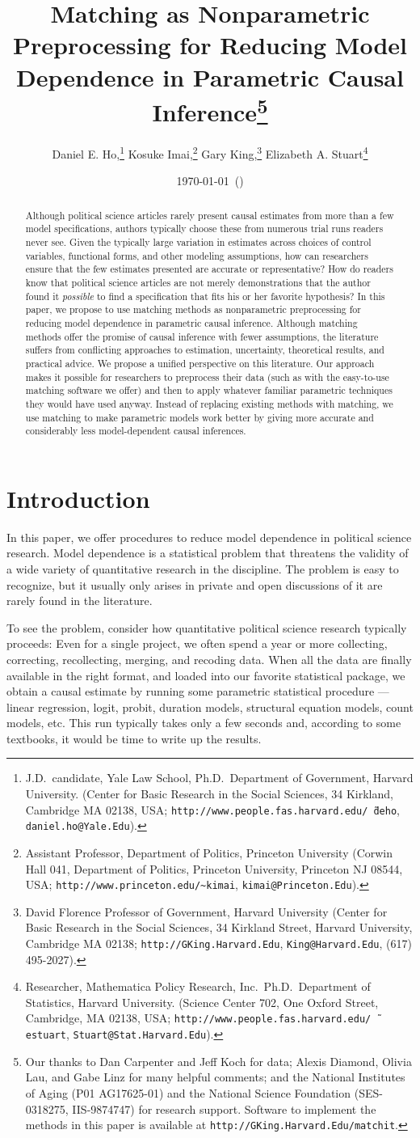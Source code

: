 \documentclass[11pt,titlepage]{article}
\title{Matching as Nonparametric Preprocessing for Reducing Model
  Dependence in Parametric Causal Inference\thanks{Our thanks to Dan
    Carpenter and Jeff Koch for data; Alexis Diamond, Olivia Lau, and
    Gabe Linz for many helpful comments; and the National Institutes
    of Aging (P01 AG17625-01) and the National Science Foundation
    (SES-0318275, IIS-9874747) for research support.  Software to
    implement the methods in this paper is available at
    \texttt{http://GKing.Harvard.Edu/matchit}.}}
\author{Daniel E. Ho,\thanks{J.D.\ candidate, Yale Law School, Ph.D.\,
    Department of Government, Harvard University. (Center for Basic
    Research in the Social Sciences, 34 Kirkland, Cambridge MA 02138,
    USA; \texttt{http://www.people.fas.harvard.edu/\~\,deho},
    \texttt{daniel.ho@Yale.Edu}).}
Kosuke Imai,\thanks{Assistant Professor, Department of Politics, Princeton
    University (Corwin Hall 041, Department of Politics, Princeton
    University, Princeton NJ 08544, USA;
    \texttt{http://www.princeton.edu/\~{}kimai},
    \texttt{kimai@Princeton.Edu}).}
Gary King,\thanks{David Florence Professor of Government, Harvard
  University (Center for Basic Research in the Social Sciences, 34
  Kirkland Street, Harvard University, Cambridge MA 02138;
  \texttt{http://GKing.Harvard.Edu}, \texttt{King@Harvard.Edu}, (617)
  495-2027).}
Elizabeth A. Stuart\thanks{Researcher, Mathematica Policy Research, Inc.\, Ph.D.\, Department of Statistics,
  Harvard University. (Science Center 702, One Oxford Street,
  Cambridge, MA 02138, USA;
  \texttt{http://www.people.fas.harvard.edu/\~\,estuart},
  \texttt{Stuart@Stat.Harvard.Edu}).}}
\date{\today\ (\printtime)}
\begin{document}
\maketitle

\begin{abstract}
  Although political science articles rarely present causal estimates
  from more than a few model specifications, authors typically choose
  these from numerous trial runs readers never see.  Given the
  typically large variation in estimates across choices of control
  variables, functional forms, and other modeling assumptions, how can
  researchers ensure that the few estimates presented are accurate or
  representative?  How do readers know that political science articles
  are not merely demonstrations that the author found it
  \emph{possible} to find a specification that fits his or her
  favorite hypothesis?  In this paper, we propose to use matching
  methods as nonparametric preprocessing for reducing model dependence
  in parametric causal inference. Although matching methods offer the
  promise of causal inference with fewer assumptions, the literature
  suffers from conflicting approaches to estimation, uncertainty,
  theoretical results, and practical advice. We propose a unified
  perspective on this literature. Our approach makes it possible for
  researchers to preprocess their data (such as with the easy-to-use
  matching software we offer) and then to apply whatever familiar
  parametric techniques they would have used anyway.  Instead of
  replacing existing methods with matching, we use matching to make
  parametric models work better by giving more accurate and
  considerably less model-dependent causal inferences.
\end{abstract}

\section{Introduction}

In this paper, we offer procedures to reduce model dependence in
political science research.  Model dependence is a statistical problem
that threatens the validity of a wide variety of quantitative research
in the discipline.  The problem is easy to recognize, but it usually
only arises in private and open discussions of it are rarely found in
the literature.

To see the problem, consider how quantitative political science
research typically proceeds: Even for a single project, we often spend
a year or more collecting, correcting, recollecting, merging, and
recoding data.  When all the data are finally available in the right
format, and loaded into our favorite statistical package, we obtain a
causal estimate by running some parametric statistical procedure ---
linear regression, logit, probit, duration models, structural equation
models, count models, etc.  This run typically takes only a few
seconds and, according to some textbooks, it would be time to write up
the results.
\end{document}
